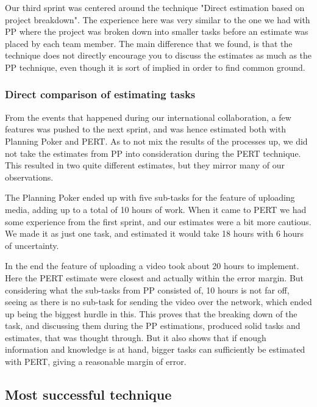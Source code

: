 Our third sprint was centered around the technique "Direct estimation based on project breakdown". The experience here was very similar to the one we had with PP where the project was broken down into smaller tasks before an estimate was placed by each team member. The main difference that we found, is that the technique does not directly encourage you to discuss the estimates as much as the PP technique, even though it is sort of implied in order to find common ground.\\

\subsubsection{Direct comparison of estimating tasks}
From the events that happened during our international collaboration, a few features was pushed to the next sprint, and was hence estimated both with Planning Poker and PERT. As to not mix the results of the processes up, we did not take the estimates from PP into consideration during the PERT technique. This resulted in two quite different estimates, but they mirror many of our observations.

The Planning Poker ended up with five sub-tasks for the feature of uploading media, adding up to a total of 10 hours of work. When it came to PERT we had some experience from the first sprint, and our estimates were a bit more cautious. We made it as just one task, and estimated it would take 18 hours with 6 hours of uncertainty.

In the end the feature of uploading a video took about 20 hours to implement. Here the PERT estimate were closest and actually within the error margin. But considering what the sub-tasks from PP consisted of, 10 hours is not far off, seeing as there is no sub-task for sending the video over the network, which ended up being the biggest hurdle in this. This proves that the breaking down of the task, and discussing them during the PP estimations, produced solid tasks and estimates, that was thought through. But it also shows that if enough information and knowledge is at hand, bigger tasks can sufficiently be estimated with PERT, giving a reasonable margin of error. \\

\subsection{Most successful technique}

















